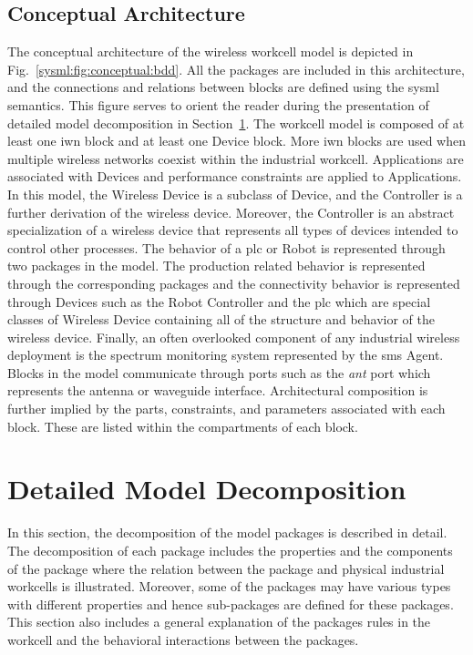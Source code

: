 \subsection{Conceptual Architecture}\label{sysml:sec:architecture}
The conceptual architecture of the wireless workcell model is depicted in Fig.~\ref{sysml:fig:conceptual:bdd}. All the packages are included in this architecture, and the connections and relations between blocks are defined using the \gls{sysml} semantics. This figure serves to orient the reader during the presentation of detailed model decomposition in Section~\ref{sysml:sec:detailed-model}. The workcell model is composed of at least one \gls{iwn} block and at least one Device block. More \gls{iwn} blocks are used when multiple wireless networks coexist within the industrial workcell. Applications are associated with Devices and performance constraints are applied to Applications. In this model, the Wireless Device is a subclass of Device, and the Controller is a further derivation of the wireless device. Moreover, the Controller is an abstract specialization of a wireless device that represents all types of devices intended to control other processes. The behavior of a \gls{plc} or Robot is represented through two packages in the model. The production related behavior is represented through the corresponding packages and the connectivity behavior is represented through Devices such as the Robot Controller and the \gls{plc} which are special classes of Wireless Device containing all of the structure and behavior of the wireless device. Finally, an often overlooked component of any industrial wireless deployment is the spectrum monitoring system represented by the \gls{sms} Agent. Blocks in the model communicate through ports such as the \textit{ant} port which represents the antenna or waveguide interface.  Architectural composition is further implied by the parts, constraints, and parameters associated with each block. These are listed within the compartments of each block.

\section{Detailed Model Decomposition}\label{sysml:sec:detailed-model}
In this section, the decomposition of the model packages is described in detail. The decomposition of each package includes the properties and the components of the package where the relation between the package and physical industrial workcells is illustrated. Moreover, some of the packages may have various types with different properties and hence sub-packages are defined for these packages. This section also includes a general explanation of the packages rules in the workcell and the behavioral interactions between the packages.      

